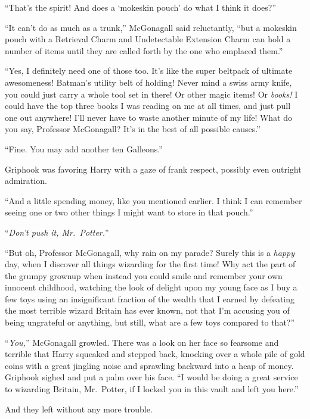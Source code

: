 “That’s the spirit! And does a ‘mokeskin pouch’ do what I think it does?”

“It can’t do as much as a trunk,” McGonagall said reluctantly, “but a mokeskin pouch with a Retrieval Charm and Undetectable Extension Charm can hold a number of items until they are called forth by the one who emplaced them.”

“Yes, I definitely need one of those too. It’s like the super beltpack of ultimate awesomeness! Batman’s utility belt of holding! Never mind a swiss army knife, you could just carry a whole tool set in there! Or other magic items! Or \emph{books!} I could have the top three books I was reading on me at all times, and just pull one out anywhere! I’ll never have to waste another minute of my life! What do you say, Professor McGonagall? It’s in the best of all possible causes.”

“Fine. You may add another ten Galleons.”

Griphook was favoring Harry with a gaze of frank respect, possibly even outright admiration.

“And a little spending money, like you mentioned earlier. I think I can remember seeing one or two other things I might want to store in that pouch.”

“\emph{Don’t push it, Mr.~Potter.}”

“But oh, Professor McGonagall, why rain on my parade? Surely this is a \emph{happy} day, when I discover all things wizarding for the first time! Why act the part of the grumpy grownup when instead you could smile and remember your own innocent childhood, watching the look of delight upon my young face as I buy a few toys using an insignificant fraction of the wealth that I earned by defeating the most terrible wizard Britain has ever known, not that I’m accusing you of being ungrateful or anything, but still, what are a few toys compared to that?”

“\emph{You,}” McGonagall growled. There was a look on her face so fearsome and terrible that Harry squeaked and stepped back, knocking over a whole pile of gold coins with a great jingling noise and sprawling backward into a heap of money. Griphook sighed and put a palm over his face. “I would be doing a great service to wizarding Britain, Mr.~Potter, if I locked you in this vault and left you here.”

And they left without any more trouble.
